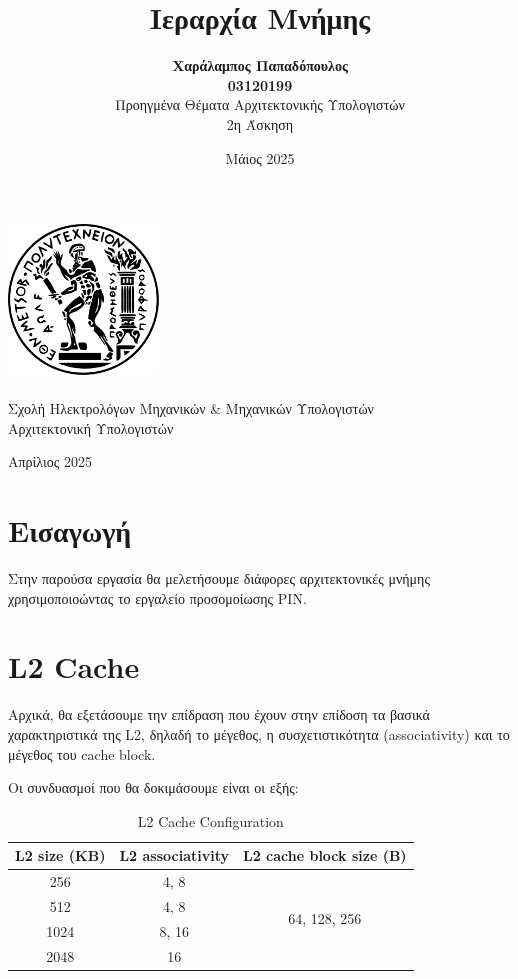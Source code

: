 \documentclass{article}
\title{\Huge Ιεραρχία Μνήμης}
\author{
  \textbf{Χαράλαμπος Παπαδόπουλος\\ 03120199} \\[3cm]
  {Προηγμένα Θέματα Αρχιτεκτονικής Υπολογιστών\\ 2η Άσκηση} \\
}
\date{Μάιος 2025}
\begin{document}
\begin{titlepage}
    \centering
    \vspace{3cm}

    \includegraphics[width=4cm]{figures/emp.png}\\
    \vspace{1.5cm}
    {\fontsize{24pt}{20pt}\selectfont{Εθνικό Μετσόβιο Πολυτεχνείο}}\\[0.3cm]
    {\fontsize{16pt}{18pt}\selectfont Σχολή Ηλεκτρολόγων Μηχανικών \& Μηχανικών Υπολογιστών}\\[0.3cm]
    {\fontsize{16pt}{18pt}\selectfont Αρχιτεκτονική Υπολογιστών}\\[2cm]

    {\Huge\bfseries \thetitle \par}
    \vspace{2cm}
    {\Large \theauthor \par}
    \vfill

    {\fontsize{15pt}{18pt}Απρίλιος 2025}
\end{titlepage}

\section{Εισαγωγή}
Στην παρούσα εργασία θα μελετήσουμε διάφορες αρχιτεκτονικές μνήμης χρησιμοποιοώντας το εργαλείο προσομοίωσης PIN.

\section{L2 Cache}
Αρχικά, θα εξετάσουμε την επίδραση που έχουν στην επίδοση τα βασικά χαρακτηριστικά της L2, δηλαδή το μέγεθος, η συσχετιστικότητα (associativity) και το μέγεθος του cache block.

Οι συνδυασμοί που θα δοκιμάσουμε είναι οι εξής:

\begin{table}[h!]
\centering
\begin{tabular}{|c|c|c|}
\hline
\textbf{L2 size (KB)} & \textbf{L2 associativity} & \textbf{L2 cache block size (B)} \\
\hline
256 & 4, 8 & \multirow{4}{*}{64, 128, 256} \\
\cline{1-2}
512 & 4, 8 & \\
\cline{1-2}
1024 & 8, 16 & \\
\cline{1-2}
2048 & 16 & \\
\hline
\end{tabular}
\caption{L2 Cache Configuration}
\label{tab:l2cache}
\end{table}
\end{document}
